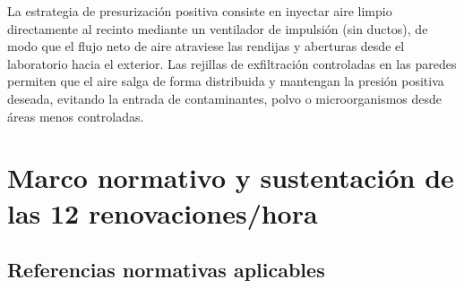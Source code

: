\documentclass[12pt,a4paper]{article}
\begin{document}
La estrategia de presurización positiva consiste en inyectar aire limpio directamente al recinto mediante un ventilador de impulsión (sin ductos), de modo que el flujo neto de aire atraviese las rendijas y aberturas desde el laboratorio hacia el exterior. Las rejillas de exfiltración controladas en las paredes permiten que el aire salga de forma distribuida y mantengan la presión positiva deseada, evitando la entrada de contaminantes, polvo o microorganismos desde áreas menos controladas.

\section{Marco normativo y sustentación de las 12 renovaciones/hora}

\subsection{Referencias normativas aplicables}
\end{document}
